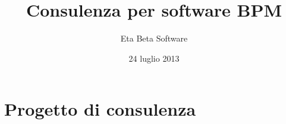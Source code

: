 \documentclass[compress,9pt]{beamer}
\title{Consulenza per software BPM}
\author{Eta Beta Software}
\date{24 luglio 2013}
\begin{document}
\begin{frame}
\maketitle
\end{frame}

\begin{frame}
\begin{multicols}{2}
\tableofcontents
\newpage
\begin{figure}
\setlength{\fboxsep}{.2pt}
\end{figure}
\end{multicols}
\end{frame}

\section{Progetto di consulenza}
\end{document}
